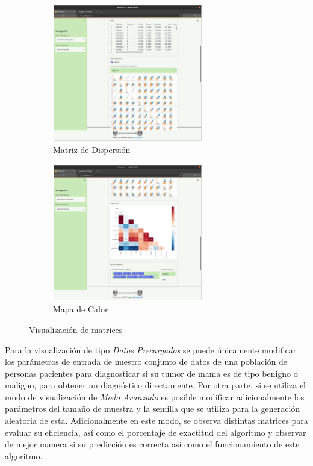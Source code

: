 \documentclass[10pt]{article}
\begin{document}
    \begin{figure}[H]
    
    \begin{subfigure}{0.5\textwidth}
    \centering
    \includegraphics[height=6cm]{img/RLogistica_MDispersion.png} 
    \caption{Matriz de Dispersión}
    \label{fig:RLMD}
    \end{subfigure}
    \begin{subfigure}{0.5\textwidth}
    \centering
    \includegraphics[height=6cm]{img/RLogistica_HeatMap.png}
    \caption{Mapa de Calor}
    \label{fig:RLHM}
    \end{subfigure}
    
    \caption{Visualización de matrices}
    \label{fig:RLogisticVar}
    \end{figure}
    
    Para la visualización de tipo \textit{Datos Precargados} se puede únicamente modificar los parámetros de entrada de nuestro conjunto de datos de una población de personas pacientes para diagnosticar si su tumor de mama es de tipo benigno o maligno, para obtener un diagnóstico directamente. Por otra parte, si se utiliza el modo de visualización de \textit{Modo Avanzado} es posible modificar adicionalmente los parámetros del tamaño de muestra y la semilla que se utiliza para la generación aleatoria de esta. Adicionalmente en este modo, se observa distintas matrices para evaluar su eficiencia, así como el porcentaje de exactitud del algoritmo y observar de mejor manera si su predicción es correcta así como el funcionamiento de este algoritmo.
    
\end{document}

